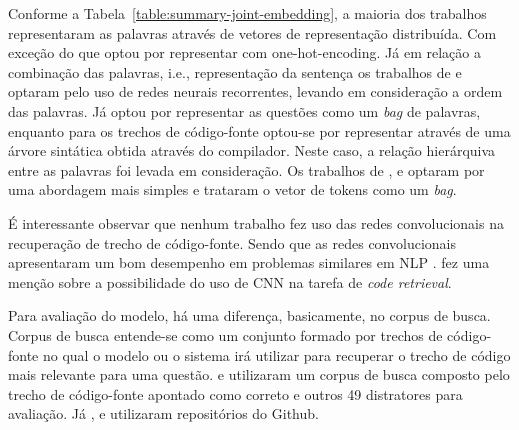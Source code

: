 Conforme a Tabela~\ref{table:summary-joint-embedding}, a maioria dos trabalhos representaram as palavras através de vetores de representação distribuída. Com exceção do \cite{iyer-etal-2016-summarizing} que optou por representar com \gls{one-hot-encoding}. Já em relação a combinação das palavras, i.e., representação da sentença os trabalhos de \cite{Gu-deep-code-search:2018} e \cite{iyer-etal-2016-summarizing} optaram pelo uso de redes neurais recorrentes, levando em consideração a ordem das palavras. Já \cite{Allamanis-bimodal-source-code-natural-language:2015} optou por representar as questões como um \textit{bag} de palavras, enquanto para os trechos de código-fonte optou-se por representar através de uma árvore sintática obtida através do compilador. Neste caso, a relação hierárquiva entre as palavras foi levada em consideração. Os trabalhos de \cite{Chen-bi-variational-autoencoder:2018}, \cite{Sachdev-neural-code-search:2018} e \cite{cambronero-deep-learning-code-search:2019} optaram por uma abordagem mais simples e trataram o vetor de tokens como um \textit{bag}.

É interessante observar que nenhum trabalho fez uso das redes convolucionais na recuperação de trecho de código-fonte. Sendo que as redes convolucionais apresentaram um bom desempenho em problemas similares em NLP \citep{lai-etal-2018-review, tan-lstm-qa, feng-2015}. \citeauthor{yao-2018} fez uma menção sobre a possibilidade do uso de CNN na tarefa de \textit{code retrieval}.

Para avaliação do modelo, há uma diferença, basicamente, no corpus de busca. Corpus de busca entende-se como um conjunto formado por trechos de código-fonte no qual o modelo ou o sistema irá utilizar para recuperar o trecho de código mais relevante para uma questão. \cite{iyer-etal-2016-summarizing} e \cite{Chen-bi-variational-autoencoder:2018} utilizaram um corpus de busca composto pelo trecho de código-fonte apontado como correto e outros 49 distratores para avaliação. Já \cite{Gu-deep-code-search:2018}, \cite{Sachdev-neural-code-search:2018} e \cite{cambronero-deep-learning-code-search:2019} utilizaram repositórios do Github.  

